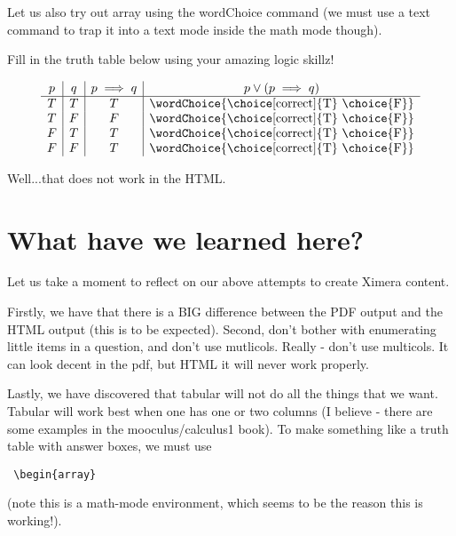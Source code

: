 \documentclass{ximera}
\begin{document}
Let us also try out array using the wordChoice command (we must use a text command to trap it into a text mode inside the math mode though).


\begin{problem}
Fill in the truth table below using your amazing logic skillz!

\begin{prompt}
\begin{center}
\[
\begin{array}{c|c|c|c}
		p & q & p \implies q & p \vee (p \implies q) \\
		\hline
		T & T & T & \text{\wordChoice{\choice[correct]{T} \choice{F}}} \\
		T & F & F & \text{\wordChoice{\choice[correct]{T} \choice{F}}} \\
		F & T & T & \text{\wordChoice{\choice[correct]{T} \choice{F}}} \\
		F & F & T & \text{\wordChoice{\choice[correct]{T} \choice{F}}}
	\end{array}
    \]
\end{center}
\end{prompt}
\end{problem}

Well...that does not work in the HTML.

\section{What have we learned here?}
    Let us take a moment to reflect on our above attempts to create Ximera content. 
    
    Firstly, we have that there is a BIG difference between the PDF output and the HTML output (this is to be expected). Second, don't bother with enumerating little items in a question, and don't use mutlicols. Really - don't use multicols. It can look decent in the pdf, but HTML it will never work properly.
    
Lastly, we have discovered that tabular will not do all the things that we want. Tabular will work best when one has one or two columns (I believe - there are some examples in the mooculus/calculus1 book). To make something like a truth table with answer boxes, we must use \begin{verbatim} \begin{array} \end{verbatim} (note this is a math-mode environment, which seems to be the reason this is working!). 
\end{document}
